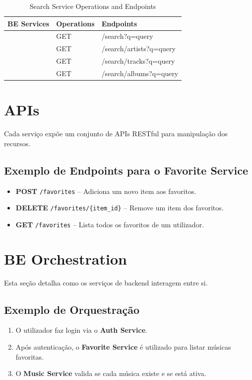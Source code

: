 \documentclass[a4paper,12pt]{article}
\begin{document}
\begin{table}[H]
    \centering
    \renewcommand{\arraystretch}{1.2}
    \begin{tabular}{|>{\centering\arraybackslash}m{4cm}|m{3cm}|m{7cm}|}
    \hline
    \textbf{BE Services} & \textbf{Operations} & \textbf{Endpoints} \\
    \hline
    \multirow{4}{*}{\textbf{Search Service}} 
    & GET & /search?q={query} \\
    & GET & /search/artists?q={query} \\
    & GET & /search/tracks?q={query} \\
    & GET & /search/albums?q={query} \\
    \hline
    \end{tabular}
    \caption{Search Service Operations and Endpoints}
\end{table}


\clearpage %

\section{APIs}
Cada serviço expõe um conjunto de APIs RESTful para manipulação dos recursos.

\subsection{Exemplo de Endpoints para o Favorite Service}
\begin{itemize}
    \item \textbf{POST} \texttt{/favorites} – Adiciona um novo item aos favoritos.
    \item \textbf{DELETE} \texttt{/favorites/\{item\_id\}} – Remove um item dos favoritos.
    \item \textbf{GET} \texttt{/favorites} – Lista todos os favoritos de um utilizador.
\end{itemize}

\clearpage %

\section{BE Orchestration}
Esta seção detalha como os serviços de backend interagem entre si.

\subsection{Exemplo de Orquestração}
\begin{enumerate}
    \item O utilizador faz login via o \textbf{Auth Service}.
    \item Após autenticação, o \textbf{Favorite Service} é utilizado para listar músicas favoritas.
    \item O \textbf{Music Service} valida se cada música existe e se está ativa.
\end{enumerate}
\end{document}
